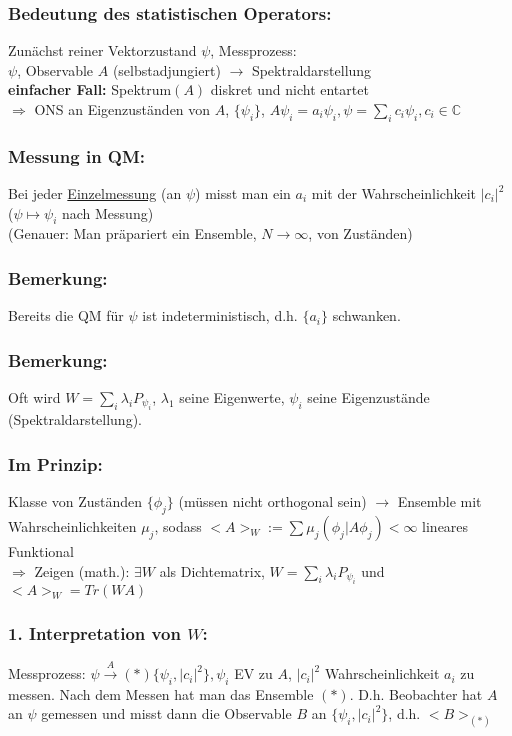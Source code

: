 \documentclass[twoside,a4paper]{scrartcl}
\newcommand{\C}{\mathbb{C}}
\renewcommand{\1}{\mathds{1}}
\newcommand{\Ra}{\Rightarrow}
\newcommand{\ra}{\rightarrow}
\renewcommand{\l}{\lambda}
\renewcommand{\C}{\mathbb{C}}
\begin{document}
\subsubsection*{Bedeutung des statistischen Operators:}
Zunächst reiner Vektorzustand $\psi$, Messprozess:\\
$\psi$, Observable $A$ (selbstadjungiert) $\ra$ Spektraldarstellung\\
\textbf{einfacher Fall:} Spektrum$(A)$ diskret und nicht entartet\\
$\Ra$ ONS an Eigenzuständen von $A$, $\{\psi_i\}$, $A\psi_i=a_i\psi_i, \psi=\sum_i c_i \psi_i,c_i\in \C$
\subsubsection*{Messung in QM:}
Bei jeder \underline{Einzelmessung} (an $\psi$) misst man ein $a_i$ mit der Wahrscheinlichkeit $|c_i|^2$ ($\psi \mapsto \psi_i$ nach Messung)\\
(Genauer: Man präpariert ein Ensemble, $N \ra \infty$, von Zuständen)
\subsubsection*{Bemerkung:}
Bereits die QM für $\psi$ ist indeterministisch, d.h. $\{a_i\}$ schwanken.
\subsubsection*{Bemerkung:}
Oft wird $W=\sum_i \l_i P_{\psi_i}$, $\l_1$ seine Eigenwerte, $\psi_i$ seine Eigenzustände (Spektraldarstellung).
\subsubsection*{Im Prinzip:}
Klasse von Zuständen $\{\phi_j\}$ (müssen nicht orthogonal sein) $\ra$ Ensemble mit Wahrscheinlichkeiten $\mu_j$, sodass $<A>_W:= \sum \mu_j (\phi_j|A\phi_j)<\infty$ lineares Funktional\\
$\Ra$ Zeigen (math.): $\exists W$ als Dichtematrix, $W=\sum_i \l_i P_{\psi_i}$ und $<A>_W=Tr(WA)$
\subsubsection*{1. Interpretation von $W$:}
Messprozess: $\psi \stackrel{A}{\ra} (*)\{\psi_i,|c_i|^2\}, \psi_i$ EV zu $A$, $|c_i|^2$ Wahrscheinlichkeit $a_i$ zu messen. Nach dem Messen hat man das Ensemble $(*)$. D.h. Beobachter hat $A$ an $\psi$ gemessen und misst dann die Observable $B$ an $\{\psi_i,|c_i|^2\}$, d.h. $<B>_{(*)}$
\end{document}
